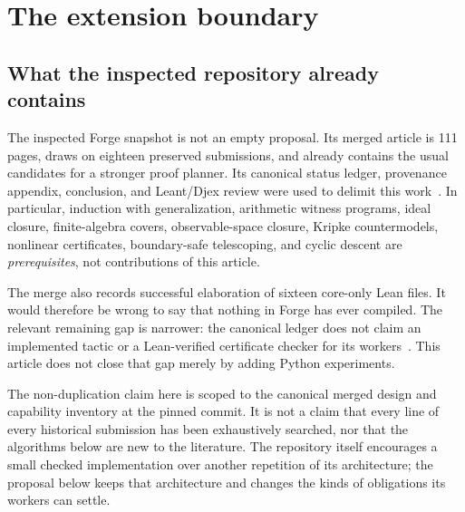 \section{The extension boundary}
\label{sec:scope}

\subsection{What the inspected repository already contains}

The inspected Forge snapshot is not an empty proposal. Its merged article is
111 pages, draws on eighteen preserved submissions, and already contains the
usual candidates for a stronger proof planner. Its canonical status ledger,
provenance appendix, conclusion, and Leant/Djex review were used to delimit this
work~\cite{forge,forge-status,forge-provenance,forge-ideas}. In particular,
induction with generalization, arithmetic witness programs, ideal closure,
finite-algebra covers, observable-space closure, Kripke countermodels,
nonlinear certificates, boundary-safe telescoping, and cyclic descent are
\emph{prerequisites}, not contributions of this article.

The merge also records successful elaboration of sixteen core-only Lean files.
It would therefore be wrong to say that nothing in Forge has ever compiled.
The relevant remaining gap is narrower: the canonical ledger does not claim an
implemented \forge{} tactic or a Lean-verified certificate checker for its
workers~\cite{forge-status}. This article does not close that gap merely by
adding Python experiments.

The non-duplication claim here is scoped to the canonical merged design and
capability inventory at the pinned commit. It is not a claim that every line of
every historical submission has been exhaustively searched, nor that the
algorithms below are new to the literature. The repository itself encourages a
small checked implementation over another repetition of its architecture; the
proposal below keeps that architecture and changes the kinds of obligations its
workers can settle.


